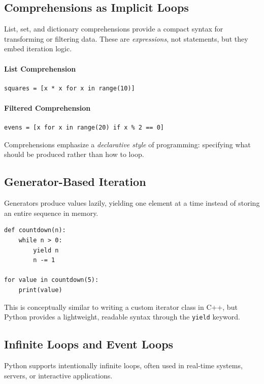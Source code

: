 \subsection{Comprehensions as Implicit Loops}

List, set, and dictionary comprehensions provide a compact syntax for transforming or filtering data. These are \emph{expressions}, not statements, but they embed iteration logic.

\paragraph{List Comprehension}
\begin{verbatim}
squares = [x * x for x in range(10)]
\end{verbatim}

\paragraph{Filtered Comprehension}
\begin{verbatim}
evens = [x for x in range(20) if x % 2 == 0]
\end{verbatim}

Comprehensions emphasize a \emph{declarative style} of programming: specifying what should be produced rather than how to loop.

\subsection{Generator-Based Iteration}

Generators produce values lazily, yielding one element at a time instead of storing an entire sequence in memory.

\begin{verbatim}
def countdown(n):
    while n > 0:
        yield n
        n -= 1

for value in countdown(5):
    print(value)
\end{verbatim}

This is conceptually similar to writing a custom iterator class in C++, but Python provides a lightweight, readable syntax through the \texttt{yield} keyword.

\subsection{Infinite Loops and Event Loops}

Python supports intentionally infinite loops, often used in real-time systems, servers, or interactive applications.


